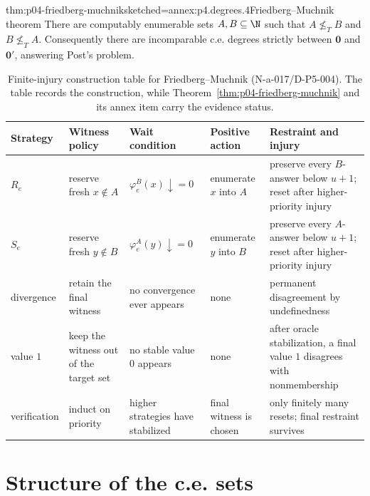 \begin{hbtheorem}{thm:p04-friedberg-muchnik}{sketched=annex:p4.degrees.4}{Friedberg--Muchnik theorem}
There are computably enumerable sets \(A,B\subseteq\N\) such that
\(A\not\leq_TB\) and \(B\not\leq_TA\).  Consequently there are incomparable
c.e. degrees strictly between \(\mathbf0\) and \(\mathbf0'\), answering
Post's problem.
\end{hbtheorem}

\begin{table}[htbp]
\centering
\small
\begin{tabular}{@{}p{.65in}p{1.15in}p{1.25in}p{1.25in}p{1.30in}@{}}
\toprule
Strategy & Witness policy & Wait condition & Positive action & Restraint and injury \\
\midrule
\(R_e\) & reserve fresh \(x\notin A\) & \(\varphi_e^B(x)\downarrow=0\) & enumerate \(x\) into \(A\) & preserve every \(B\)-answer below \(u+1\); reset after higher-priority injury \\
\(S_e\) & reserve fresh \(y\notin B\) & \(\varphi_e^A(y)\downarrow=0\) & enumerate \(y\) into \(B\) & preserve every \(A\)-answer below \(u+1\); reset after higher-priority injury \\
divergence & retain the final witness & no convergence ever appears & none & permanent disagreement by undefinedness \\
value \(1\) & keep the witness out of the target set & no stable value \(0\) appears & none & after oracle stabilization, a final value \(1\) disagrees with nonmembership \\
verification & induct on priority & higher strategies have stabilized & final witness is chosen & only finitely many resets; final restraint survives \\
\bottomrule
\end{tabular}
\caption{Finite-injury construction table for Friedberg--Muchnik
(N-a-017/D-P5-004).  The table records the construction, while
Theorem~\ref{thm:p04-friedberg-muchnik} and its annex item carry the evidence
status.}
\label{tab:p04-finite-injury}
\end{table}

\section{Structure of the c.e. sets}
\label{sec:p04-ce-structure}

